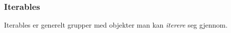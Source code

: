 
\begin{frame}
    \frametitle{Iterables}

    Iterables er generelt grupper med objekter man kan \textit{iterere} seg gjennom. 

\end{frame}
